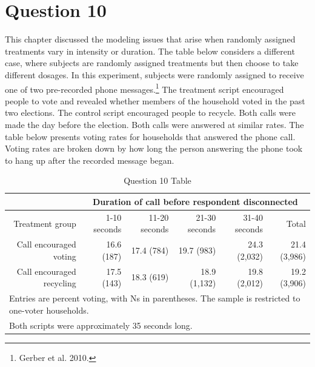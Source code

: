 \documentclass[11pt,notitlepage]{article}\usepackage[]{graphicx}\usepackage[]{color}
\begin{document}
\section*{Question 10}
This chapter discussed the modeling issues that arise when randomly assigned treatments vary in intensity or duration. The table below considers a different case, where subjects are randomly assigned treatments but then choose to take different dosages. In this experiment, subjects were randomly assigned to receive one of two pre-recorded phone messages.\footnote{Gerber et al. 2010.} The treatment script encouraged people to vote and revealed whether members of the household voted in the past two elections. The control script encouraged people to recycle. Both calls were made the day before the election. Both calls were answered at similar rates. The table below presents voting rates for households that answered the phone call. Voting rates are broken down by how long the person answering the phone took to hang up after the recorded message began.

\begin{table}[htbp]
  \centering
  \caption{Question 10 Table}
    \begin{tabular}{rrrrrr}
    \toprule
          & \multicolumn{5}{c}{Duration of call before respondent disconnected } \\
    \midrule
    Treatment group  & 1-10 seconds  & 11-20 seconds  & 21-30 seconds  & 31-40 seconds  & Total  \\
    Call encouraged voting  & 16.6 (187)  & 17.4 (784)  & 19.7 (983)  & 24.3 (2,032)  & 21.4 (3,986)  \\
    Call encouraged recycling  & 17.5 (143)  & 18.3 (619)  & 18.9 (1,132)  & 19.8 (2,012)  & 19.2 (3,906)  \\
    \bottomrule
    \multicolumn{6}{l}{Entries are percent voting, with Ns in parentheses. The sample is restricted to one-voter households.}\\
        \multicolumn{6}{l}{Both scripts were approximately 35 seconds long.}\\
    \end{tabular}%
  \label{tab:addlabel}%
\end{table}%
\end{document}
